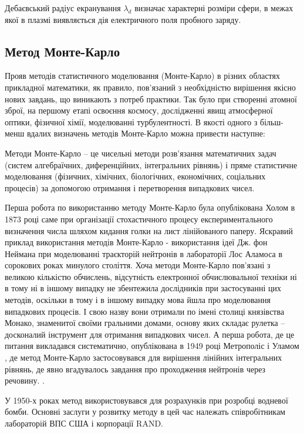 \documentclass[a4paper,12pt]{article}
\begin{document}
Дебаєвський радіус екранування $\lambda_{d}$ визначає характерні розміри сфери, в межах якої в плазмі виявляється дія електричного поля пробного заряду.



\subsection{Метод Монте-Карло}
Прояв методів статистичного моделювання (Монте-Карло) в різних областях прикладної математики, як правило, пов'язаний з необхідністю вирішення якісно нових завдань, що виникають з потреб практики. Так було при створенні атомної зброї, на першому етапі освоєння космосу, дослідженні явищ атмосферної оптики, фізичної хімії, моделюванні турбулентності. В якості одного з більш-менш вдалих визначень методів Монте-Карло можна привести наступне:

Методи Монте-Карло -- це чисельні методи розв'язання математичних задач (систем алгебраїчних, диференційних, інтегральних рівнянь) і пряме статистичне моделювання (фізичних, хімічних, біологічних, економічних, соціальних процесів) за допомогою отримання і перетворення випадкових чисел.
 
Перша робота по використанню методу Монте-Карло була опублікована Холом в 1873 році саме при організації стохастичного процесу експериментального визначення числа шляхом кидання голки на лист лінійованого паперу. Яскравий приклад використання методів Монте-Карло - використання ідеї Дж. фон Неймана при моделюванні траєкторій нейтронів в лабораторії Лос Аламоса в сорокових роках минулого століття. Хоча методи Монте-Карло пов'язані з великою кількістю обчислень, відсутність електронної обчислювальної техніки ні в тому ні в іншому випадку не збентежила дослідників при застосуванні цих методів, оскільки в тому і в іншому випадку мова йшла про моделювання випадкових процесів. І свою назву вони отримали по імені столиці князівства Монако, знаменитої своїми гральними домами, основу яких складає рулетка -- досконалий інструмент для отримання випадкових чисел. А перша робота, де це питання викладався систематично, опублікована в 1949 році Метрополіс і Уламом \cite{Metropolis}, де метод Монте-Карло застосовувався для вирішення лінійних інтегральних рівнянь, де явно вгадувалось завдання про проходження нейтронів через речовину. \cite{belocerkovskyi}.

У 1950-х роках метод використовувався для розрахунків при розробці водневої бомби. Основні заслуги у розвитку методу в цей час належать співробітникам лабораторій ВПС США і корпорації RAND.
\end{document}

